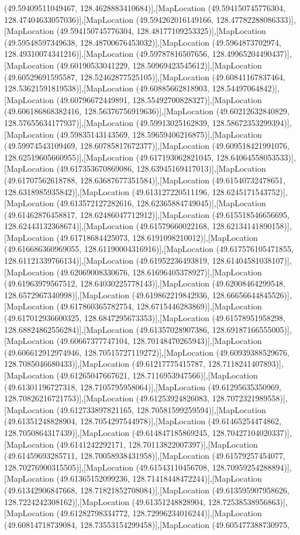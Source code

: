 (49.59409511049467, 128.4628883410684)],[MapLocation (49.594150745776304, 128.47404633057036)],[MapLocation (49.594262016149166, 128.47782288086333)],[MapLocation (49.594150745776304, 128.48177109253325)],[MapLocation (49.59548597349638, 128.48700676453032)],[MapLocation (49.5964873702974, 128.49310074341216)],[MapLocation (49.59787816507656, 128.49965204490437)],[MapLocation (49.60190533041229, 128.50969423545612)],[MapLocation (49.60529691595587, 128.52462877525105)],[MapLocation (49.60841167837464, 128.53621591819538)],[MapLocation (49.60885662818903, 128.54497064842)],[MapLocation (49.60796672449891, 128.55492700828327)],[MapLocation (49.606186868382416, 128.56376756919636)],[MapLocation (49.60212632840829, 128.57655634177937)],[MapLocation (49.59913025162839, 128.58672353299394)],[MapLocation (49.59835143143569, 128.59659406216875)],[MapLocation (49.59974543109469, 128.60785817672377)],[MapLocation (49.609518421991076, 128.62519605660955)],[MapLocation (49.617193062821045, 128.64064558053533)],[MapLocation (49.617353670869086, 128.63945169417013)],[MapLocation (49.61707562618788, 128.63687677351584)],[MapLocation (49.61540732478651, 128.6318985935842)],[MapLocation (49.613127220511196, 128.6245171543752)],[MapLocation (49.613572127282616, 128.62365884749045)],[MapLocation (49.61462876458817, 128.62486047712912)],[MapLocation (49.615518546656695, 128.62443132368674)],[MapLocation (49.61579660022168, 128.62134141890158)],[MapLocation (49.61718684425073, 128.6191098210012)],[MapLocation (49.616686360969055, 128.61190004316916)],[MapLocation (49.617576105471855, 128.61121339766134)],[MapLocation (49.61952236493819, 128.61404581038107)],[MapLocation (49.62069008330676, 128.61696405378927)],[MapLocation (49.61963979567512, 128.64030225778143)],[MapLocation (49.62008464299548, 128.6572967340998)],[MapLocation (49.619862219842936, 128.66656644845526)],[MapLocation (49.617860365782754, 128.6715446283869)],[MapLocation (49.617012936600325, 128.6847295673353)],[MapLocation (49.61578951958298, 128.68824862556284)],[MapLocation (49.61357028907386, 128.69187166555005)],[MapLocation (49.60667377747104, 128.70148470265943)],[MapLocation (49.606612912974946, 128.70515727119272)],[MapLocation (49.60939388529676, 128.7085046680433)],[MapLocation (49.61217775415787, 128.7118241407893)],[MapLocation (49.61265047667621, 128.7116953947566)],[MapLocation (49.61301196727318, 128.7105795958064)],[MapLocation (49.61295635350969, 128.70826216721753)],[MapLocation (49.61253924826083, 128.7072321989558)],[MapLocation (49.612733897821165, 128.70581599259594)],[MapLocation (49.61351248828904, 128.7054297544978)],[MapLocation (49.61465254474862, 128.7050864317439)],[MapLocation (49.614847185869245, 128.70427104020337)],[MapLocation (49.6141242292171, 128.70113822007397)],[MapLocation (49.61459693285711, 128.70058938431958)],[MapLocation (49.61579257454077, 128.70276900315505)],[MapLocation (49.61543110456708, 128.70959254288894)],[MapLocation (49.61365152099236, 128.71418448472244)],[MapLocation (49.61342906847668, 128.71821852708084)],[MapLocation (49.613595907958626, 128.7224242308162)],[MapLocation (49.61351248828904, 128.72538538956863)],[MapLocation (49.61282798334772, 128.72996234016244)],[MapLocation (49.60814718739084, 128.73553154299458)],[MapLocation (49.605477388730975, 